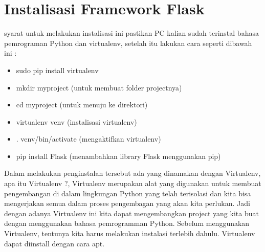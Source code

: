 \section{Instalisasi Framework Flask}
syarat untuk melakukan instalisasi ini pastikan PC kalian sudah terinstal bahasa pemrograman Python dan virtualenv, setelah
itu lakukan cara seperti dibawah ini :
\begin{itemize}
    \item sudo pip install virtualenv 
    \item mkdir myproject (untuk membuat folder projectnya)
    \item cd myproject (untuk menuju ke direktori)
    \item virtualenv venv (instalisasi virtualenv)
    \item . venv/bin/activate (mengaktifkan virtualenv)
    \item pip install Flask (menambahkan library Flask menggunakan pip)
\end{itemize}
Dalam melakukan penginstalan tersebut ada yang dinamakan dengan Virtualenv, apa itu Virtualenv ?, Virtualenv merupakan alat yang
digunakan untuk membuat pengembangan di dalam lingkungan Python yang telah terisolasi dan kita bisa mengerjakan semua dalam
proses pengembagan yang akan kita perlukan. Jadi dengan adanya Virtualenv ini kita dapat mengembangkan project yang kita buat
dengan menggunakan bahasa pemrogramman Python.
Sebelum menggunakan Virtualenv, tentunya kita harus melakukan instalasi terlebih dahulu.
Virtualenv dapat diinstall dengan cara apt.
